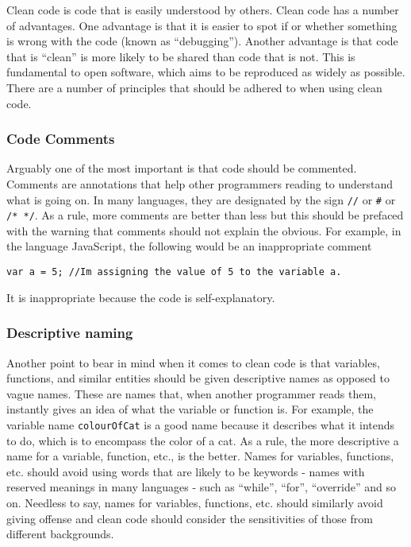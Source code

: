 \documentclass[
  letterpaper,
  DIV=11,
  numbers=noendperiod]{scrreport}
\begin{document}
Clean code is code that is easily understood by others. Clean code has a
number of advantages. One advantage is that it is easier to spot if or
whether something is wrong with the code (known as ``debugging'').
Another advantage is that code that is ``clean'' is more likely to be
shared than code that is not. This is fundamental to open software,
which aims to be reproduced as widely as possible. There are a number of
principles that should be adhered to when using clean code.

\hypertarget{code-comments}{%
\subsubsection{Code Comments}\label{code-comments}}

Arguably one of the most important is that code should be commented.
Comments are annotations that help other programmers reading to
understand what is going on. In many languages, they are designated by
the sign \texttt{//} or \texttt{\#} or \texttt{/*\ */}. As a rule, more
comments are better than less but this should be prefaced with the
warning that comments should not explain the obvious. For example, in
the language JavaScript, the following would be an inappropriate comment

\texttt{var\ a\ =\ 5;\ //I\textquotesingle{}m\ assigning\ the\ value\ of\ 5\ to\ the\ variable\ a.}

It is inappropriate because the code is self-explanatory.

\hypertarget{descriptive-naming}{%
\subsubsection{Descriptive naming}\label{descriptive-naming}}

Another point to bear in mind when it comes to clean code is that
variables, functions, and similar entities should be given descriptive
names as opposed to vague names. These are names that, when another
programmer reads them, instantly gives an idea of what the variable or
function is. For example, the variable name \texttt{colourOfCat} is a
good name because it describes what it intends to do, which is to
encompass the color of a cat. As a rule, the more descriptive a name for
a variable, function, etc., is the better. Names for variables,
functions, etc. should avoid using words that are likely to be keywords
- names with reserved meanings in many languages - such as ``while'',
``for'', ``override'' and so on. Needless to say, names for variables,
functions, etc. should similarly avoid giving offense and clean code
should consider the sensitivities of those from different backgrounds.
\end{document}
